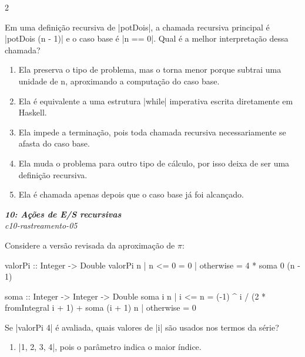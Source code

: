 \documentclass[a4paper,10pt,brazil]{article}
\begin{document}
\begin{multicols}{2}
\begin{flushright}
\end{flushright}
Em uma definição recursiva de \haskellinline|potDois|, a chamada recursiva principal é
\haskellinline|potDois (n - 1)| e o caso base é \haskellinline|n == 0|. Qual é a melhor interpretação dessa chamada?

\begin{enumerate}
  \item Ela preserva o tipo de problema, mas o torna menor porque subtrai uma unidade de n, aproximando a computação do caso base.

  \item Ela é equivalente a uma estrutura \haskellinline|while| imperativa escrita diretamente em Haskell.

  \item Ela impede a terminação, pois toda chamada recursiva necessariamente se afasta do caso base.

  \item Ela muda o problema para outro tipo de cálculo, por isso deixa de ser uma definição recursiva.

  \item Ela é chamada apenas depois que o caso base já foi alcançado.


\end{enumerate}

\begin{flushright}
  \footnotesize
  \textit{\textbf{10: Ações de E/S recursivas}}\\
  \textit{c10-rastreamento-05}\\

\end{flushright}
Considere a versão revisada da aproximação de \(\pi\):

\begin{haskellcode}
valorPi :: Integer -> Double
valorPi n
  | n <= 0    = 0
  | otherwise = 4 * soma 0 (n - 1)

soma :: Integer -> Integer -> Double
soma i n
  | i <= n    = (-1) ^ i / (2 * fromIntegral i + 1)
                  + soma (i + 1) n
  | otherwise = 0
\end{haskellcode}

Se \haskellinline|valorPi 4| é avaliada, quais valores de \haskellinline|i| são usados nos termos da série?

\begin{enumerate}
  \item \haskellinline|1, 2, 3, 4|, pois o parâmetro indica o maior índice.


\end{enumerate}
\end{multicols}
\end{document}
